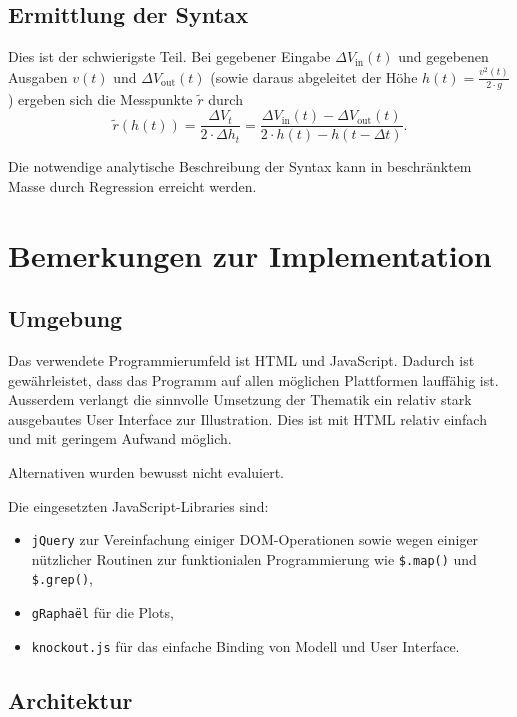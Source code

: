 \documentclass[11pt]{scrreprt} %
\theoremstyle{definition}
\begin{document}
\section{Ermittlung der Syntax}

Dies ist der schwierigste Teil. Bei gegebener Eingabe $\Delta V_\text{in}(t)$ und gegebenen Ausgaben $v(t)$ und $\Delta V_\text{out}(t)$ (sowie daraus abgeleitet der Höhe $h(t) = \frac {v^2(t)}{2\cdot g}$) ergeben sich die Messpunkte $\tilde r$ durch
\[
	\tilde r(h(t)) = \frac {\Delta V_t}{2 \cdot \Delta h_t} = \frac {\Delta V_\text{in}(t)-\Delta V_\text{out}(t)} {2 \cdot h(t) - h(t-\Delta t)}.
\]

Die notwendige analytische Beschreibung der Syntax kann in beschränktem Masse durch Regression erreicht werden.

\chapter{Bemerkungen zur Implementation}

\section{Umgebung}

Das verwendete Programmierumfeld ist HTML und JavaScript. Dadurch ist gewährleistet, dass das Programm auf allen möglichen Plattformen lauffähig ist. Ausserdem verlangt die sinnvolle Umsetzung der Thematik ein relativ stark ausgebautes User Interface zur Illustration. Dies ist mit HTML relativ einfach und mit geringem Aufwand möglich.

Alternativen wurden bewusst nicht evaluiert.


Die eingesetzten JavaScript-Libraries sind:
\begin{itemize}
\item {\tt jQuery} \cite{lib:jquery} zur Vereinfachung einiger DOM-Operationen sowie wegen einiger nützlicher Routinen zur funktionialen Programmierung wie {\tt \$.map()} und {\tt \$.grep()},
\item {\tt gRaphaël} \cite{lib:graphael} für die Plots,
\item {\tt knockout.js} \cite{lib:knockout} für das einfache Binding von Modell und User Interface.
\end{itemize}

\section{Architektur}
\end{document}
